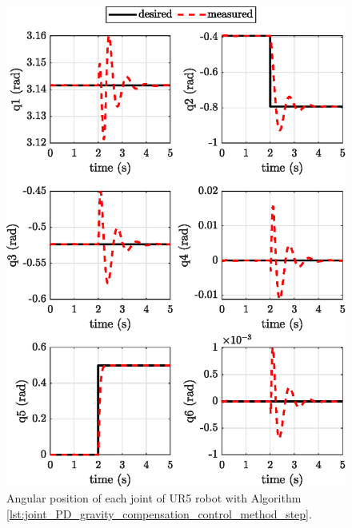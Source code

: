 \begin{figure}[H]
	\centering
	\includegraphics{images/act_1.6_step/joint_position.eps}
	\caption{Angular position of each joint of UR5 robot with Algorithm \ref{lst:joint_PD_gravity_compensation_control_method_step}.}
	\label{fig:act_1.6_step_joint_position}
\end{figure}
